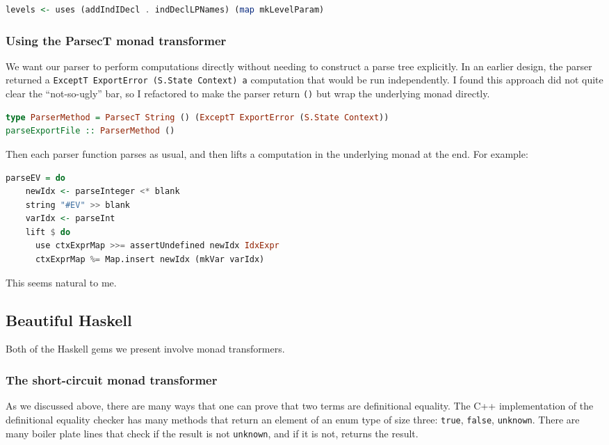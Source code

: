 \documentclass{article}
\begin{document}
\begin{spacing}{1.1}
\begin{lstlisting}[language=Haskell]
levels <- uses (addIndIDecl . indDeclLPNames) (map mkLevelParam)
\end{lstlisting}

\subsubsection{Using the ParsecT monad transformer}

We want our parser to perform computations directly without needing to construct a parse tree explicitly. In an earlier design, the parser returned a \lstinline{ExceptT ExportError (S.State Context) a} computation that would be run independently. I found this approach did not quite clear the ``not-so-ugly'' bar, so I refactored to make the parser return \lstinline{()} but wrap the underlying monad directly.
\begin{lstlisting}[language=Haskell]
type ParserMethod = ParsecT String () (ExceptT ExportError (S.State Context))
parseExportFile :: ParserMethod ()
\end{lstlisting}

Then each parser function parses as usual, and then lifts a computation in the underlying monad at the end. For example:
\begin{lstlisting}[language=Haskell]
  parseEV = do
    newIdx <- parseInteger <* blank
    string "#EV" >> blank
    varIdx <- parseInt
    lift $ do
      use ctxExprMap >>= assertUndefined newIdx IdxExpr
      ctxExprMap %= Map.insert newIdx (mkVar varIdx)
\end{lstlisting}

This seems natural to me.

\subsection{Beautiful Haskell}

Both of the Haskell gems we present involve monad transformers.

\subsubsection{The short-circuit monad transformer}

As we discussed above, there are many ways that one can prove that two terms are definitional equality. The C++ implementation of the definitional equality checker has many methods that return an element of an enum type of size three: \lstinline{true}, \lstinline{false}, \lstinline{unknown}. There are many boiler plate lines that check if the result is not \lstinline{unknown}, and if it is not, returns the result.


\end{spacing}
\end{document}
